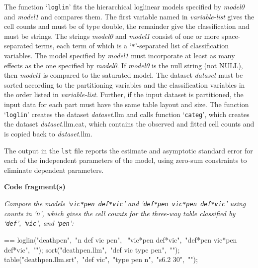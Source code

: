 \documentclass{book}
\makeatletter
\newcommand\Texinfocommandstyletextvar[1]{{\normalfont{}\textsl{#1}}}%
\newenvironment{Texinfopreformatted}{%
  \par\GNUTobeylines\obeyspaces\frenchspacing\parskip=\z@\parindent=\z@}{}
{\catcode`\^^M=13 \gdef\GNUTobeylines{\catcode`\^^M=13 \def^^M{\null\par}}}
\newenvironment{Texinfoindented}{\begin{list}{}{}\item\relax}{\end{list}}
\renewcommand{\_}{\Texinfounderscore\discretionary{}{}{}}
\makeatother
\begin{document}
The function `\texttt{loglin}' fits the hierarchical
loglinear models specified by \Texinfocommandstyletextvar{model0} and \Texinfocommandstyletextvar{model1}
and compares them.
The first variable named in \Texinfocommandstyletextvar{variable-list} gives the
cell counts and must be of type double, the remainder give the classification
and must be strings.
The strings \Texinfocommandstyletextvar{model0} and \Texinfocommandstyletextvar{model1} consist of one or more space-separated
terms, each term of which is a `\texttt{*}'-separated list of classification variables.
The model specified by \Texinfocommandstyletextvar{model1} must incorporate at least as many effects
as the one specified by \Texinfocommandstyletextvar{model0}.
If \Texinfocommandstyletextvar{model0} is the null string (not NULL),
then \Texinfocommandstyletextvar{model1} is compared to the saturated model.
The dataset \Texinfocommandstyletextvar{dataset} must be sorted according to
the partitioning variables and the classification
variables in the order listed in \Texinfocommandstyletextvar{variable-list}.
Further, if the input dataset is partitioned, the input data for each part
must have the same table layout and size.
The function `\texttt{loglin}' creates the dataset \Texinfocommandstyletextvar{dataset}.llm
and calls function `\texttt{categ}', which creates the dataset
\Texinfocommandstyletextvar{dataset}.llm.cat, which contains the observed and fitted cell counts and
is copied back to \Texinfocommandstyletextvar{dataset}.llm.

The output in the \texttt{lst} file reports the estimate and asymptotic standard
error for each of the independent parameters of the model, using zero-sum
constraints to eliminate dependent parameters.

\noindent{}\textbf{Code fragment(s)}

\emph{Compare the models `\texttt{vic*pen def*vic}' and `\texttt{def*pen vic*pen def*vic}'
using counts in `\texttt{n}', which gives the cell counts for the three-way
table classified by `\texttt{def}', `\texttt{vic}', and `\texttt{pen}':}
\begin{Texinfoindented}
\begin{Texinfopreformatted}%
\ttfamily loglin("deathpen",\ "n def vic pen",
\       "vic*pen def*vic",\ "def*pen vic*pen def*vic",\ "");
sort("deathpen.llm",\ "def vic \_type\_ pen",\ "");
table("deathpen.llm.srt",\ "def vic",\ "\_type\_ pen n",\ "s6.2 30",\ "");
\end{Texinfopreformatted}
\end{Texinfoindented}
\end{document}
